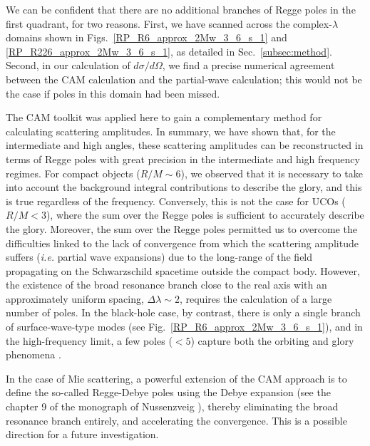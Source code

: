 \documentclass[aps,prd,longbibliography,reprint,twocolumn,amsmath,amssymb,amsfonts,showpacs,footnote,superscriptaddress]{revtex4-1}%
\begin{document}
We can be confident that there are no additional branches of Regge poles in the first quadrant, for two reasons. First, we have scanned across the complex-$\lambda$ domains shown in Figs.~\ref{RP_R6_approx_2Mw_3_6_s_1} and \ref{RP_R226_approx_2Mw_3_6_s_1}, as detailed in Sec.~\ref{subsec:method}. Second, in our calculation of $d\sigma/d\Omega$, we find a precise numerical agreement between the CAM calculation and the partial-wave calculation; this would not be the case if poles in this domain had been missed.

The CAM toolkit was applied here to gain a complementary method for calculating scattering amplitudes. In summary, we have shown that, for the intermediate and high angles, these scattering amplitudes can be reconstructed in terms of Regge poles with great precision in the intermediate and high frequency regimes. For compact objects ($R/M\sim6$), we observed that it is necessary to take into account the background integral contributions to describe the glory, and this is true regardless of the frequency. Conversely, this is not the case for UCOs ($R/M < 3$), where the sum over the Regge poles is sufficient to accurately describe the glory. Moreover, the sum over the Regge poles permitted us to overcome the difficulties linked to the lack of convergence from which the scattering amplitude suffers (\textit{i.e.} partial wave expansions) due to the long-range of the field propagating on the Schwarzschild spacetime outside the compact body. However, the existence of the broad resonance branch %
close to the real axis with an approximately uniform spacing, $\Delta\lambda\sim 2$, requires the calculation of a large number of poles. In the black-hole case, by contrast, there is only a single branch of surface-wave-type modes (see Fig.~\ref{RP_R6_approx_2Mw_3_6_s_1}), and in the high-frequency limit, a few poles ($<5$) capture both the orbiting and glory phenomena \cite{Folacci:2019cmc, Folacci:2019vtt}.

In the case of Mie scattering, a powerful extension of the CAM approach is to define the so-called Regge-Debye poles using the Debye expansion (see the chapter 9 of the monograph of Nussenzveig \cite{Nussenzveig:2006}), thereby eliminating the broad resonance branch entirely, and accelerating the convergence. This is a possible direction for a future investigation.

\end{document}
